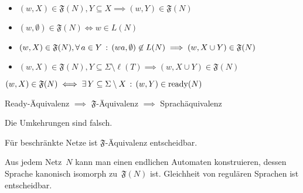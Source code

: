\documentclass{cheat-sheet}
\DeclareMathOperator{\ready}{ready} %
\newcommand{\Failure}{\mathfrak{F}} %
\begin{document}
\begin{lem}
  \begin{itemize}
    \item $(w, X) \in \Failure(N), Y \subseteq X \implies (w, Y) \in \Failure(N)$
    \item $(w, \emptyset) \in \Failure(N) \iff w \in L(N)$
    \item $(w, X) \in \Failure(N), \fa{a \in Y} (wa, \emptyset) \not\in L(N) \implies (w, X \cup Y) \in \Failure(N)$
    \item $(w, X) \in \Failure(N), Y \subseteq \Sigma \setminus \ell(T) \implies (w, X \cup Y) \in \Failure(N)$
  \end{itemize}
\end{lem}

\begin{lem}
  $
    (w, X) \in \Failure(N) \iff \ex{Y \subseteq \Sigma \setminus X} (w, Y) \in \ready(N)
  $
\end{lem}

\begin{satz}
  Ready-Äquivalenz $\implies$ $\Failure$-Äquivalenz $\implies$ Sprachäquivalenz
\end{satz}

\begin{bem}
  Die Umkehrungen sind falsch.
\end{bem}

\begin{satz}
  Für beschränkte Netze ist $\Failure$-Äquivalenz entscheidbar.
\end{satz}

\begin{beweisidee}
  Aus jedem Netz~$N$ kann man einen endlichen Automaten konstruieren, dessen Sprache kanonisch isomorph zu~$\Failure(N)$ ist.
  Gleichheit von regulären Sprachen ist entscheidbar.
\end{beweisidee}

\end{document}
